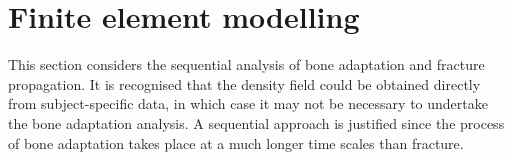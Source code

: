 \documentclass[review]{elsarticle}
\numberwithin{equation}{section}
\begin{document}


\section{Finite element modelling}

This section considers the sequential analysis of bone adaptation and fracture propagation. It is recognised that the density field could be obtained directly from subject-specific data, in which case it may not be necessary to undertake the bone adaptation analysis. A sequential approach is justified since the process of bone adaptation takes place at a much longer time scales than fracture.
\end{document}
